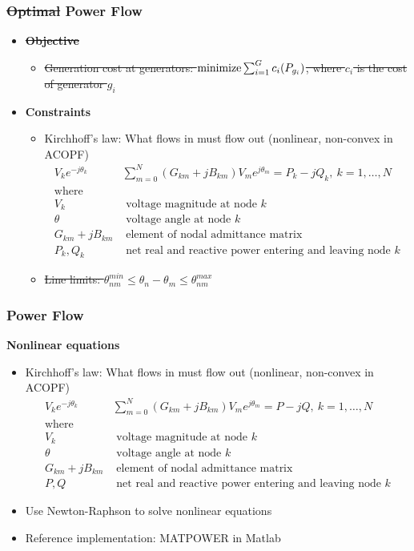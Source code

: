 \begin{frame}[fragile]
  \frametitle{\sout{Optimal} Power Flow}
  \begin{itemize}
    \item {\bf \sout{Objective}}
    \begin{itemize}
      \item \sout{Generation cost at generators:
      $ \minimize \sum^G_{i=1} c_i(P_{g_i})$, where $c_i$ is the cost of generator $g_i$}
    \end{itemize}
    \item {\bf Constraints}
    \begin{itemize}
      \item Kirchhoff's law: What flows in must flow out (nonlinear, non-convex in ACOPF)
      \begin{align*}
        V_k e^{-j\theta_k} & \sum^{N}_{m=0} (G_{km} + jB_{km})V_m e^{j\theta_m} = P_k - j Q_k,\ k = 1, \dots, N \\
        \text{where}\\
        V_k &\text{ voltage magnitude at node } k\\
        \theta &\text{ voltage angle at node } k\\
        G_{km} + jB_{km}& \text{ element of nodal admittance matrix}\\
        P_k , Q_k &\text{ net real and reactive power entering and leaving node } k
      \end{align*}
      \item \sout{Line limits: $ \theta^{min}_{nm} \leq \theta_n - \theta_m \leq \theta^{max}_{nm}$}
    \end{itemize}
  \end{itemize}
\end{frame}

\begin{frame}[fragile]
  \frametitle{Power Flow}
  {\bf Nonlinear equations}
  \begin{itemize}
      \item Kirchhoff's law: What flows in must flow out (nonlinear, non-convex in ACOPF)
      \begin{align*}
        V_k e^{-j\theta_k} & \sum^{N}_{m=0} (G_{km} + jB_{km})V_m e^{j\theta_m} = P - jQ,\ k = 1, \dots, N \\
        \text{where}\\
        V_k &\text{ voltage magnitude at node } k\\
        \theta &\text{ voltage angle at node } k\\
        G_{km} + jB_{km}& \text{ element of nodal admittance matrix}\\
        P, Q &\text{ net real and reactive power entering and leaving node } k
      \end{align*}
      \item Use Newton-Raphson to solve nonlinear equations
      \item Reference implementation: MATPOWER in Matlab
  \end{itemize}
\end{frame}

